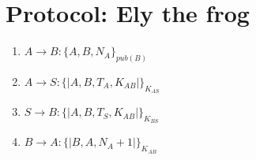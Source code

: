 \section{Protocol: Ely the frog}

\begin{enumerate}
    \item $ A \rightarrow B : \{A, B, N_A\}_{pub(B)}$
    \item $ A \rightarrow S : \{|A, B, T_{A}, K_{AB}|\}_{K_{AS}}$
    \item $ S \rightarrow B : \{|A, B, T_{S}, K_{AB}|\}_{K_{BS}}$
    \item $ B \rightarrow A : \{|B, A, N_A+1|\}_{K_{AB}}$
    \end{enumerate}